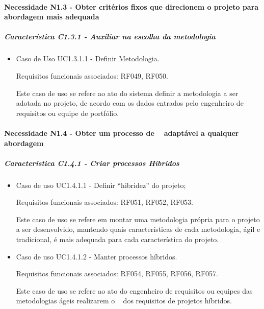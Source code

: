 \paragraph{Necessidade N1.3 - Obter critérios fixos que direcionem o projeto para abordagem mais adequada}
	\subparagraph{Característica C1.3.1 - Auxiliar na escolha da metodologia}
		\begin{itemize}
			
			\item Caso de Uso UC1.3.1.1 - Definir Metodologia.
					
					Requisitos funcionais associados: RF049, RF050.

					Este caso de uso se refere ao ato do sistema definir a metodologia a ser adotada no projeto, de acordo com os dados entrados pelo engenheiro de requisitos ou equipe de portfólio.
		\end{itemize}

\paragraph{Necessidade N1.4 - Obter um processo de \er~ adaptável a qualquer abordagem}
	\subparagraph{Característica C1.4.1 - Criar processos Híbridos}
		\begin{itemize}
			
			\item Caso de uso UC1.4.1.1 - Definir ``hibridez'' do projeto;
					
					Requisitos funcionais associados: RF051, RF052, RF053.
					
					Este caso de uso se refere em montar uma metodologia própria para o projeto a ser desenvolvido, mantendo quais características de cada metodologia, ágil e tradicional, é mais adequada para cada característica do projeto.
			
			\item Caso de uso UC1.4.1.2 - Manter processos híbridos.
					
					Requisitos funcionais associados: RF054, RF055, RF056, RF057.
					
					Este caso de uso se refere ao ato do engenheiro de requisitos ou equipes das metodologias ágeis realizarem o \CRUD~ dos requisitos de projetos híbridos.
		\end{itemize}

